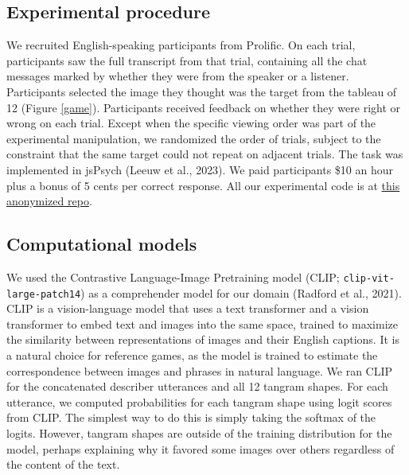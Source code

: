 \documentclass[10pt, letterpaper]{article}
\begin{document}
\subsection{Experimental procedure}\label{experimental-procedure}

We recruited English-speaking participants from Prolific. On each trial,
participants saw the full transcript from that trial, containing all the
chat messages marked by whether they were from the speaker or a
listener. Participants selected the image they thought was the target
from the tableau of 12 (Figure \ref{game}). Participants received
feedback on whether they were right or wrong on each trial. Except when
the specific viewing order was part of the experimental manipulation, we
randomized the order of trials, subject to the constraint that the same
target could not repeat on adjacent trials. The task was implemented in
jsPsych (Leeuw et al., 2023). We paid participants \$10 an hour plus a
bonus of 5 cents per correct response. All our experimental code is at
\href{https://osf.io/bfk8y/?view_only=165b81c5d69446f18e1bfd23e3d9cb5f}{this
anonymized repo}.

\subsection{Computational models}\label{computational-models}

We used the Contrastive Language-Image Pretraining model (CLIP;
\texttt{clip-vit-large-patch14}) as a comprehender model for our domain
(Radford et al., 2021). CLIP is a vision-language model that uses a text
transformer and a vision transformer to embed text and images into the
same space, trained to maximize the similarity between representations
of images and their English captions. It is a natural choice for
reference games, as the model is trained to estimate the correspondence
between images and phrases in natural language. We ran CLIP for the
concatenated describer utterances and all 12 tangram shapes. For each
utterance, we computed probabilities for each tangram shape using logit
scores from CLIP. The simplest way to do this is simply taking the
softmax of the logits. However, tangram shapes are outside of the
training distribution for the model, perhaps explaining why it favored
some images over others regardless of the content of the text.
\end{document}
